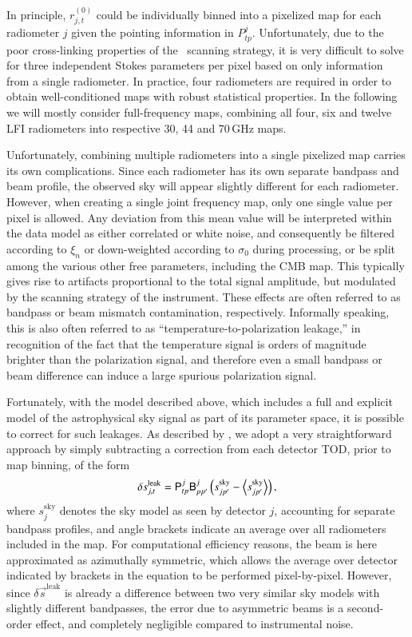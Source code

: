\documentclass[onecolumn]{aa}
\newcommand{\s}[0]{\vec{s}}
\newcommand{\B}[0]{\tens{B}}
\renewcommand{\P}[0]{\tens{P}}
\begin{document}
In principle, $r^{(0)}_{j,t}$ could be individually binned into a
pixelized map for each radiometer $j$ given the pointing information
in $P^{j}_{tp}$. Unfortunately, due to the poor cross-linking
properties of the \Planck\ scanning strategy, it is very difficult to
solve for three independent Stokes parameters per pixel based on only
information from a single radiometer. In practice, four radiometers
are required in order to obtain well-conditioned maps with robust
statistical properties. In the following we will mostly consider
full-frequency maps, combining all four, six and twelve LFI
radiometers into respective 30, 44 and 70\,GHz maps.

Unfortunately, combining multiple radiometers into a single pixelized
map carries its own complications. Since each radiometer has its own
separate bandpass and beam profile, the observed sky will appear
slightly different for each radiometer. However, when creating a
single joint frequency map, only one single value per pixel is
allowed. Any deviation from this mean value will be interpreted within
the data model as either correlated or white noise, and consequently
be filtered according to $\xi_n$ or down-weighted according to
$\sigma_0$ during processing, or be split among the various other free
parameters, including the CMB map. This typically gives rise to
artifacts proportional to the total signal amplitude, but modulated by
the scanning strategy of the instrument. These effects are often
referred to as bandpass or beam mismatch contamination,
respectively. Informally speaking, this is also often referred to as
``temperature-to-polarization leakage,'' in recognition of the fact
that the temperature signal is orders of magnitude brighter than the
polarization signal, and therefore even a small bandpass or beam
difference can induce a large spurious polarization signal.

Fortunately, with the model described above, which includes a full and
explicit model of the astrophysical sky signal as part of its
parameter space, it is possible to correct for such leakages. As
described by \citet{bp09}, we adopt a very straightforward approach by
simply subtracting a correction from each detector TOD, prior to map
binning, of the form
\begin{equation}
\delta s^{\mathrm{leak}}_{j, t} = \P^{j}_{tp}\B_{pp'}^j\left(s^{\mathrm{sky}}_{jp'} - \left<s^{\mathrm{sky}}_{jp'}\right>\right),
\label{eq:leak}
\end{equation}
where $s^{\mathrm{sky}}_{j}$ denotes the sky model as seen by detector
$j$, accounting for separate bandpass profiles, and angle brackets
indicate an average over all radiometers included in the map. For
computational efficiency reasons, the beam is here approximated as
azimuthally symmetric, which allows the average over detector
indicated by brackets in the equation to be performed
pixel-by-pixel. However, since $\delta \s^{\mathrm{leak}}$ is already a
difference between two very similar sky models with slightly different
bandpasses, the error due to asymmetric beams is a second-order
effect, and completely negligible compared to instrumental noise.
\end{document}
